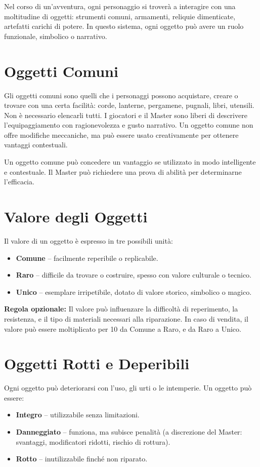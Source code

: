 \documentclass[../manuale_main.tex]{subfiles}
\begin{document}
Nel corso di un’avventura, ogni personaggio si troverà a interagire con una moltitudine di oggetti: strumenti comuni, armamenti, reliquie dimenticate, artefatti carichi di potere. In questo sistema, ogni oggetto può avere un ruolo funzionale, simbolico o narrativo.

\section*{Oggetti Comuni}

Gli oggetti comuni sono quelli che i personaggi possono acquistare, creare o trovare con una certa facilità: corde, lanterne, pergamene, pugnali, libri, utensili. Non è necessario elencarli tutti. I giocatori e il Master sono liberi di descrivere l'equipaggiamento con ragionevolezza e gusto narrativo. Un oggetto comune non offre modifiche meccaniche, ma può essere usato creativamente per ottenere vantaggi contestuali.

Un oggetto comune può concedere un vantaggio se utilizzato in modo intelligente e contestuale. Il Master può richiedere una prova di abilità per determinarne l’efficacia.

\section{Valore degli Oggetti}

Il valore di un oggetto è espresso in tre possibili unità:
\begin{itemize}
  \item \textbf{Comune} – facilmente reperibile o replicabile.
  \item \textbf{Raro} – difficile da trovare o costruire, spesso con valore culturale o tecnico.
  \item \textbf{Unico} – esemplare irripetibile, dotato di valore storico, simbolico o magico.
\end{itemize}

\textbf{Regola opzionale:} Il valore può influenzare la difficoltà di reperimento, la resistenza, e il tipo di materiali necessari alla riparazione. In caso di vendita, il valore può essere moltiplicato per 10 da Comune a Raro, e da Raro a Unico.

\section*{Oggetti Rotti e Deperibili}

Ogni oggetto può deteriorarsi con l’uso, gli urti o le intemperie. Un oggetto può essere:
\begin{itemize}
  \item \textbf{Integro} – utilizzabile senza limitazioni.
  \item \textbf{Danneggiato} – funziona, ma subisce penalità (a discrezione del Master: svantaggi, modificatori ridotti, rischio di rottura).
  \item \textbf{Rotto} – inutilizzabile finché non riparato.
\end{itemize}
\end{document}
